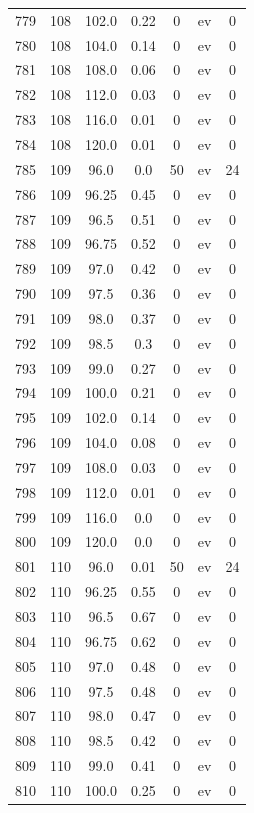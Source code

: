 \documentclass[12pt,a4paper]{article}
\begin{document}
\begin{tabular}{r|cccccc}
	779 & 108 & 102.0 & 0.22 & 0 & ev & 0 \\
	780 & 108 & 104.0 & 0.14 & 0 & ev & 0 \\
	781 & 108 & 108.0 & 0.06 & 0 & ev & 0 \\
	782 & 108 & 112.0 & 0.03 & 0 & ev & 0 \\
	783 & 108 & 116.0 & 0.01 & 0 & ev & 0 \\
	784 & 108 & 120.0 & 0.01 & 0 & ev & 0 \\
	785 & 109 & 96.0 & 0.0 & 50 & ev & 24 \\
	786 & 109 & 96.25 & 0.45 & 0 & ev & 0 \\
	787 & 109 & 96.5 & 0.51 & 0 & ev & 0 \\
	788 & 109 & 96.75 & 0.52 & 0 & ev & 0 \\
	789 & 109 & 97.0 & 0.42 & 0 & ev & 0 \\
	790 & 109 & 97.5 & 0.36 & 0 & ev & 0 \\
	791 & 109 & 98.0 & 0.37 & 0 & ev & 0 \\
	792 & 109 & 98.5 & 0.3 & 0 & ev & 0 \\
	793 & 109 & 99.0 & 0.27 & 0 & ev & 0 \\
	794 & 109 & 100.0 & 0.21 & 0 & ev & 0 \\
	795 & 109 & 102.0 & 0.14 & 0 & ev & 0 \\
	796 & 109 & 104.0 & 0.08 & 0 & ev & 0 \\
	797 & 109 & 108.0 & 0.03 & 0 & ev & 0 \\
	798 & 109 & 112.0 & 0.01 & 0 & ev & 0 \\
	799 & 109 & 116.0 & 0.0 & 0 & ev & 0 \\
	800 & 109 & 120.0 & 0.0 & 0 & ev & 0 \\
	801 & 110 & 96.0 & 0.01 & 50 & ev & 24 \\
	802 & 110 & 96.25 & 0.55 & 0 & ev & 0 \\
	803 & 110 & 96.5 & 0.67 & 0 & ev & 0 \\
	804 & 110 & 96.75 & 0.62 & 0 & ev & 0 \\
	805 & 110 & 97.0 & 0.48 & 0 & ev & 0 \\
	806 & 110 & 97.5 & 0.48 & 0 & ev & 0 \\
	807 & 110 & 98.0 & 0.47 & 0 & ev & 0 \\
	808 & 110 & 98.5 & 0.42 & 0 & ev & 0 \\
	809 & 110 & 99.0 & 0.41 & 0 & ev & 0 \\
	810 & 110 & 100.0 & 0.25 & 0 & ev & 0 \\

\end{tabular}
\end{document}
